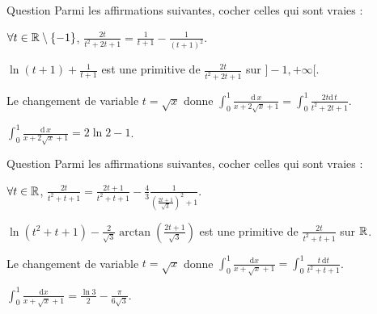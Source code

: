 \begin{multi}{Question}
Parmi les affirmations suivantes, cocher celles qui sont vraies :

    \item \(\forall t\in \mathbb{R}\setminus\{-1\}\), \(\displaystyle \frac{2t}{t^2+2t+1}=\frac{1}{t+1}-\frac{1}{(t+1)^2}\).
    \item \(\displaystyle \ln (t+1)+\frac{1}{t+1}\) est une primitive de \(\displaystyle \frac{2t}{t^2+2t+1}\) sur \(]-1,+\infty[\).
    \item* Le changement de variable \(t=\sqrt{x}\) donne \(\displaystyle \int _0^1\frac{\mathrm{d}\, x}{x+2\sqrt{x}+1}=\int _0^1\frac{2t\mathrm{d}\, t}{t^2+2t+1}\).
    \item* \(\displaystyle \int _0^1\frac{\mathrm{d}\, x}{x+2\sqrt{x}+1}=2\ln 2-1\).
\end{multi}


\begin{multi}{Question}
Parmi les affirmations suivantes, cocher celles qui sont vraies :

    \item* \(\forall t\in \mathbb{R}\), \(\displaystyle \frac{2t}{t^2+t+1}=\frac{2t+1}{t^2+t+1}-\frac{4}{3}\frac{1}{\left(\frac{2t+1}{\sqrt{3}}\right)^2+1}\).
    \item* \(\displaystyle \ln (t^2+t+1)-\frac{2}{\sqrt{3}}\arctan \left(\frac{2t+1}{\sqrt{3}}\right)\) est une primitive de \(\displaystyle \frac{2t}{t^2+t+1}\) sur \(\mathbb{R}\).
    \item Le changement de variable \(t=\sqrt{x}\) donne \(\displaystyle \int _0^1\frac{\mathrm{d}x}{x+\sqrt{x}+1}=\int _0^1\frac{t\, \mathrm{d}t}{t^2+t+1}\).
    \item \(\displaystyle \int _0^1\frac{\mathrm{d}x}{x+\sqrt{x}+1}=\frac{\ln 3}{2}-\frac{\pi}{6\sqrt{3}}\).
\end{multi}


